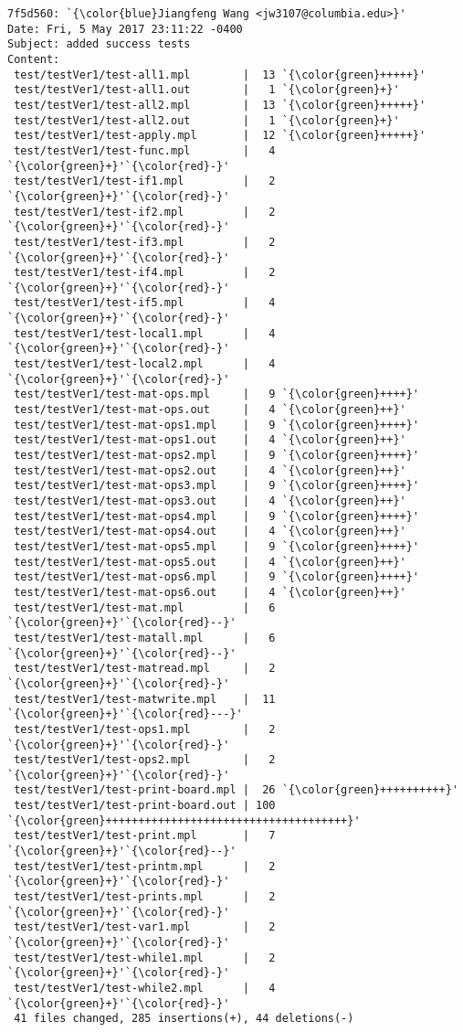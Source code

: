 \begin{lstlisting}
7f5d560: `{\color{blue}Jiangfeng Wang <jw3107@columbia.edu>}'
Date: Fri, 5 May 2017 23:11:22 -0400
Subject: added success tests
Content: 
 test/testVer1/test-all1.mpl        |  13 `{\color{green}+++++}'
 test/testVer1/test-all1.out        |   1 `{\color{green}+}'
 test/testVer1/test-all2.mpl        |  13 `{\color{green}+++++}'
 test/testVer1/test-all2.out        |   1 `{\color{green}+}'
 test/testVer1/test-apply.mpl       |  12 `{\color{green}+++++}'
 test/testVer1/test-func.mpl        |   4 `{\color{green}+}'`{\color{red}-}'
 test/testVer1/test-if1.mpl         |   2 `{\color{green}+}'`{\color{red}-}'
 test/testVer1/test-if2.mpl         |   2 `{\color{green}+}'`{\color{red}-}'
 test/testVer1/test-if3.mpl         |   2 `{\color{green}+}'`{\color{red}-}'
 test/testVer1/test-if4.mpl         |   2 `{\color{green}+}'`{\color{red}-}'
 test/testVer1/test-if5.mpl         |   4 `{\color{green}+}'`{\color{red}-}'
 test/testVer1/test-local1.mpl      |   4 `{\color{green}+}'`{\color{red}-}'
 test/testVer1/test-local2.mpl      |   4 `{\color{green}+}'`{\color{red}-}'
 test/testVer1/test-mat-ops.mpl     |   9 `{\color{green}++++}'
 test/testVer1/test-mat-ops.out     |   4 `{\color{green}++}'
 test/testVer1/test-mat-ops1.mpl    |   9 `{\color{green}++++}'
 test/testVer1/test-mat-ops1.out    |   4 `{\color{green}++}'
 test/testVer1/test-mat-ops2.mpl    |   9 `{\color{green}++++}'
 test/testVer1/test-mat-ops2.out    |   4 `{\color{green}++}'
 test/testVer1/test-mat-ops3.mpl    |   9 `{\color{green}++++}'
 test/testVer1/test-mat-ops3.out    |   4 `{\color{green}++}'
 test/testVer1/test-mat-ops4.mpl    |   9 `{\color{green}++++}'
 test/testVer1/test-mat-ops4.out    |   4 `{\color{green}++}'
 test/testVer1/test-mat-ops5.mpl    |   9 `{\color{green}++++}'
 test/testVer1/test-mat-ops5.out    |   4 `{\color{green}++}'
 test/testVer1/test-mat-ops6.mpl    |   9 `{\color{green}++++}'
 test/testVer1/test-mat-ops6.out    |   4 `{\color{green}++}'
 test/testVer1/test-mat.mpl         |   6 `{\color{green}+}'`{\color{red}--}'
 test/testVer1/test-matall.mpl      |   6 `{\color{green}+}'`{\color{red}--}'
 test/testVer1/test-matread.mpl     |   2 `{\color{green}+}'`{\color{red}-}'
 test/testVer1/test-matwrite.mpl    |  11 `{\color{green}+}'`{\color{red}---}'
 test/testVer1/test-ops1.mpl        |   2 `{\color{green}+}'`{\color{red}-}'
 test/testVer1/test-ops2.mpl        |   2 `{\color{green}+}'`{\color{red}-}'
 test/testVer1/test-print-board.mpl |  26 `{\color{green}++++++++++}'
 test/testVer1/test-print-board.out | 100 `{\color{green}+++++++++++++++++++++++++++++++++++++}'
 test/testVer1/test-print.mpl       |   7 `{\color{green}+}'`{\color{red}--}'
 test/testVer1/test-printm.mpl      |   2 `{\color{green}+}'`{\color{red}-}'
 test/testVer1/test-prints.mpl      |   2 `{\color{green}+}'`{\color{red}-}'
 test/testVer1/test-var1.mpl        |   2 `{\color{green}+}'`{\color{red}-}'
 test/testVer1/test-while1.mpl      |   2 `{\color{green}+}'`{\color{red}-}'
 test/testVer1/test-while2.mpl      |   4 `{\color{green}+}'`{\color{red}-}'
 41 files changed, 285 insertions(+), 44 deletions(-)


\end{lstlisting}
